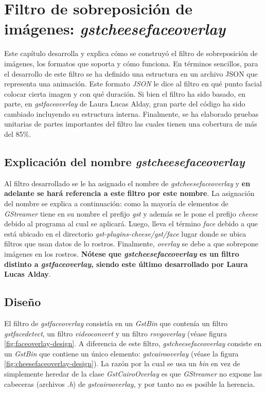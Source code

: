 \documentclass[a4paper,openright,12pt]{report}
\begin{document}
\chapter{Filtro de sobreposición de imágenes: \textit{gstcheesefaceoverlay}}
Este capítulo desarrolla y explica cómo se construyó el filtro de sobreposición
de imágenes, los formatos que soporta y cómo funciona. En términos
sencillos, para el desarrollo de este filtro se ha definido una estructura en
un archivo JSON que representa una animación. Este formato \textit{JSON} le dice
al filtro en qué punto facial colocar cierta imagen y con qué duración. Si bien
el filtro ha sido basado, en parte, en \textit{gstfaceoverlay} de
Laura Lucas Alday, gran parte del código ha sido cambiado incluyendo su
estructura interna. Finalmente, se ha elaborado pruebas unitarias de partes
importantes del filtro las cuales tienen una cobertura de más del 85\%.\\

\section{Explicación del nombre \textit{gstcheesefaceoverlay}}
Al filtro desarrollado se le ha asignado el nombre de
\textit{gstcheesefaceoverlay} y \textbf{en adelante se hará referencia a este
filtro por este nombre}. La asignación del nombre se explica a continuación:
como la mayoría de elementos de \textit{GStreamer} tiene en su nombre el prefijo
\textit{gst} y además se le pone el prefijo \textit{cheese} debido al programa
al cual se aplicará. Luego, lleva el término \textit{face} debido a que está
ubicado en el directorio \textit{gst-plugins-cheese/gst/face} lugar donde se
ubica filtros que usan datos de lo rostros. Finalmente, \textit{overlay} se debe
a que sobrepone imágenes en los rostros. \textbf{Nótese que
\textit{gstcheesefaceoverlay} es un filtro distinto a \textit{gstfaceoverlay},
siendo este último desarrollado por Laura Lucas Alday}.\\

\section{Diseño}
El filtro de \textit{gstfaceoverlay} consistía en un \textit{GstBin} que
contenía un filtro \textit{gstfacedetect}, un filtro \textit{videoconvert} y
un filtro \textit{rsvgoverlay} (véase figura \ref{fig:faceoverlay-design}.
A diferencia de este filtro, \textit{gstcheesefaceoverlay} consiste en un
\textit{GstBin} que contiene un único elemento: \textit{gstcairooverlay} (véase
la figura \ref{fig:cheesefaceoverlay-design}). La razón por la cual se usa un
\textit{bin} en vez de simplemente heredar de la clase \textit{GstCairoOverlay}
es que \textit{GStreamer} no expone las cabeceras (archivos \textit{.h}) de
\textit{gstcairooverlay}, y por tanto no es posible la herencia.
\end{document}
